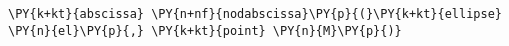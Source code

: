 \begin{Verbatim}[commandchars=\\\{\}]
      \PY{k+kt}{abscissa} \PY{n+nf}{nodabscissa}\PY{p}{(}\PY{k+kt}{ellipse} \PY{n}{el}\PY{p}{,} \PY{k+kt}{point} \PY{n}{M}\PY{p}{)}
\end{Verbatim}
